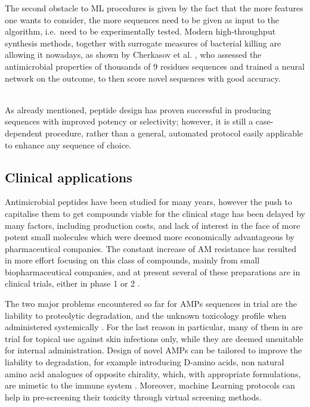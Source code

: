 The second obstacle to ML procedures is given by the fact that the more features one wants to consider, the more sequences need to be given as input to the algorithm, i.e.\ need to be experimentally tested.
%
Modern high-throughput synthesis methods, together with surrogate measures of bacterial killing are allowing it nowadays, as shown by Cherkasov et al. \cite{Cherkasov2009}, who assessed the antimicrobial properties of thousands of 9 residues sequences and trained a neural network on the outcome, to then score novel sequences with good accuracy.

\hspace{0.5cm}
\\
As already mentioned, peptide design has proven successful in producing sequences with improved potency or selectivity; however, it is still a case-dependent procedure, rather than a general, automated protocol easily applicable to enhance any sequence of choice.


\subsection{Clinical applications}
Antimicrobial peptides have been studied for many years, however the push to capitalise them to get compounds viable for the clinical stage has been delayed by many factors, including production costs, and lack of interest in the face of more potent small molecules which were deemed more economically advantageous by pharmaceutical companies.
%
The constant increase of AM resistance has resulted in more effort focusing on this class of compounds, mainly from small biopharmaceutical companies, and at present several of these preparations are in clinical trials, either in phase 1 or 2 \cite{Naafs2018}.

The two major problems encountered so far for AMPs sequences in trial are the liability to proteolytic degradation, and the unknown toxicology profile when administered systemically \cite{Hancock2006}. For the last reason in particular, many of them in are trial for topical use against skin infections only, while they are deemed unsuitable for internal administration.
%
Design of novel AMPs can be tailored to improve the liability to degradation, for example introducing D-amino acids, non natural amino acid analogues of opposite chirality, which, with appropriate formulations, are mimetic to the immune system \cite{Wipf2009}. Moreover, machine Learning protocols can help in pre-screening their toxicity through virtual screening methods.

